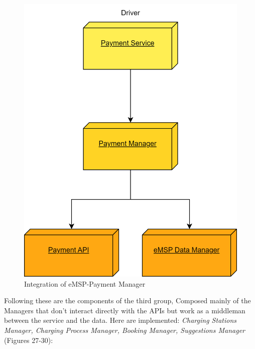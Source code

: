 \documentclass[table, 12pt]{article}
\begin{document}
\begin{figure}[H]
    \centering
    \includegraphics[scale=0.6]{assets/Integration Diagrams/eMSP-Payment Manager.png} 
    \caption{Integration of eMSP-Payment Manager}%
    \label{fig: eMSP-Payment Manager}%
\end{figure}

Following these are the components of the third group, Composed mainly of the Managers that don't interact directly with the APIs but work as a middleman between the service and the data. 
Here are implemented: \emph{ Charging Stations Manager, Charging Process Manager, Booking Manager, Suggestions Manager} (Figures 27-30):
\end{document}
